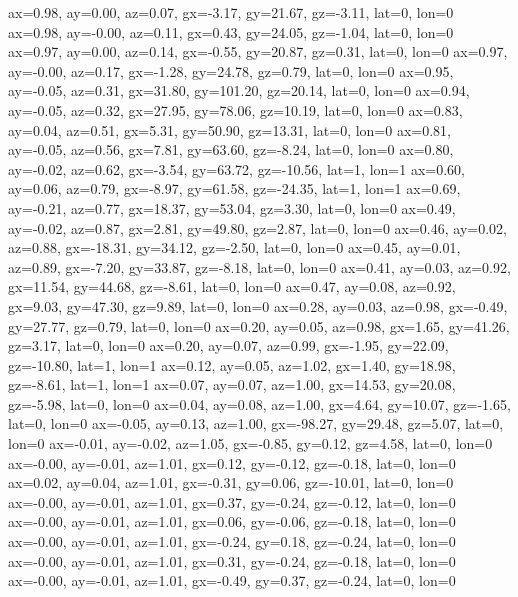 ax=0.98, ay=0.00, az=0.07, gx=-3.17, gy=21.67, gz=-3.11, lat=0, lon=0
ax=0.98, ay=-0.00, az=0.11, gx=0.43, gy=24.05, gz=-1.04, lat=0, lon=0
ax=0.97, ay=0.00, az=0.14, gx=-0.55, gy=20.87, gz=0.31, lat=0, lon=0
ax=0.97, ay=-0.00, az=0.17, gx=-1.28, gy=24.78, gz=0.79, lat=0, lon=0
ax=0.95, ay=-0.05, az=0.31, gx=31.80, gy=101.20, gz=20.14, lat=0, lon=0
ax=0.94, ay=-0.05, az=0.32, gx=27.95, gy=78.06, gz=10.19, lat=0, lon=0
ax=0.83, ay=0.04, az=0.51, gx=5.31, gy=50.90, gz=13.31, lat=0, lon=0
ax=0.81, ay=-0.05, az=0.56, gx=7.81, gy=63.60, gz=-8.24, lat=0, lon=0
ax=0.80, ay=-0.02, az=0.62, gx=-3.54, gy=63.72, gz=-10.56, lat=1, lon=1
ax=0.60, ay=0.06, az=0.79, gx=-8.97, gy=61.58, gz=-24.35, lat=1, lon=1
ax=0.69, ay=-0.21, az=0.77, gx=18.37, gy=53.04, gz=3.30, lat=0, lon=0
ax=0.49, ay=-0.02, az=0.87, gx=2.81, gy=49.80, gz=2.87, lat=0, lon=0
ax=0.46, ay=0.02, az=0.88, gx=-18.31, gy=34.12, gz=-2.50, lat=0, lon=0
ax=0.45, ay=0.01, az=0.89, gx=-7.20, gy=33.87, gz=-8.18, lat=0, lon=0
ax=0.41, ay=0.03, az=0.92, gx=11.54, gy=44.68, gz=-8.61, lat=0, lon=0
ax=0.47, ay=0.08, az=0.92, gx=9.03, gy=47.30, gz=9.89, lat=0, lon=0
ax=0.28, ay=0.03, az=0.98, gx=-0.49, gy=27.77, gz=0.79, lat=0, lon=0
ax=0.20, ay=0.05, az=0.98, gx=1.65, gy=41.26, gz=3.17, lat=0, lon=0
ax=0.20, ay=0.07, az=0.99, gx=-1.95, gy=22.09, gz=-10.80, lat=1, lon=1
ax=0.12, ay=0.05, az=1.02, gx=1.40, gy=18.98, gz=-8.61, lat=1, lon=1
ax=0.07, ay=0.07, az=1.00, gx=14.53, gy=20.08, gz=-5.98, lat=0, lon=0
ax=0.04, ay=0.08, az=1.00, gx=4.64, gy=10.07, gz=-1.65, lat=0, lon=0
ax=-0.05, ay=0.13, az=1.00, gx=-98.27, gy=29.48, gz=5.07, lat=0, lon=0
ax=-0.01, ay=-0.02, az=1.05, gx=-0.85, gy=0.12, gz=4.58, lat=0, lon=0
ax=-0.00, ay=-0.01, az=1.01, gx=0.12, gy=-0.12, gz=-0.18, lat=0, lon=0
ax=0.02, ay=0.04, az=1.01, gx=-0.31, gy=0.06, gz=-10.01, lat=0, lon=0
ax=-0.00, ay=-0.01, az=1.01, gx=0.37, gy=-0.24, gz=-0.12, lat=0, lon=0
ax=-0.00, ay=-0.01, az=1.01, gx=0.06, gy=-0.06, gz=-0.18, lat=0, lon=0
ax=-0.00, ay=-0.01, az=1.01, gx=-0.24, gy=0.18, gz=-0.24, lat=0, lon=0
ax=-0.00, ay=-0.01, az=1.01, gx=0.31, gy=-0.24, gz=-0.18, lat=0, lon=0
ax=-0.00, ay=-0.01, az=1.01, gx=-0.49, gy=0.37, gz=-0.24, lat=0, lon=0
